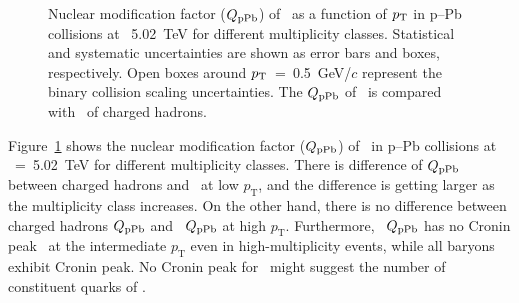 \begin{figure}[!hbt]
	\centering
	\caption{ Nuclear modification factor ($Q_{\rm{pPb}}$) of \fzero~as a function of $p_{\rm{T}}$ in p--Pb collisions at \snn~5.02~TeV for different multiplicity classes. Statistical and systematic uncertainties are shown as error bars and boxes, respectively. Open boxes around $p_{\rm{T}}$~=~0.5~GeV/$c$ represent the binary collision scaling uncertainties. The $Q_{\rm{pPb}}$ of \fzero~is compared with \fzero~of charged hadrons. }
	\label{fig:QpPb}
\end{figure}

Figure~\ref{fig:QpPb} shows the nuclear modification factor ($Q_{\rm{pPb}}$) of \fzero~in p--Pb collisions at \snn~=~5.02~TeV for different multiplicity classes. There is difference of $Q_{\rm{pPb}}$ between charged hadrons and \fzero~at low $p_{\mathrm{T}}$, and the difference is getting larger as the multiplicity class increases. On the other hand, there is no difference between charged hadrons $Q_{\rm{pPb}}$ and \fzero~$Q_{\rm{pPb}}$ at high $p_{\mathrm{T}}$. Furthermore, \fzero~$Q_{\rm{pPb}}$ has no Cronin peak~\cite{Cronin:1974zm} at the intermediate $p_{\mathrm{T}}$ even in high-multiplicity events, while all baryons exhibit Cronin peak. No Cronin peak for \fzero~might suggest the number of constituent quarks of \fzero.